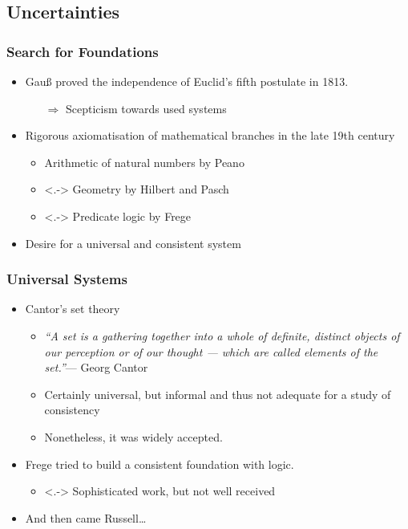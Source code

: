 \documentclass{beamer}
\begin{document}
\subsection{Uncertainties}
\begin{frame}
    \frametitle{Search for Foundations}
    \begin{itemize}[<+->]
	\item Gauß proved the independence of Euclid's fifth postulate in 1813.
	\begin{itemize}
		\item[$\Rightarrow$] Scepticism towards used systems
	\end{itemize}
	\item Rigorous axiomatisation of mathematical branches in the late 19th century
	\begin{itemize}
		\item Arithmetic of natural numbers by Peano
		\item<.-> Geometry by Hilbert and Pasch
		\item<.-> Predicate logic by Frege
	\end{itemize}
	\item Desire for a universal and consistent system
    \end{itemize}
\end{frame}
\begin{frame}
    \frametitle{Universal Systems}
    \begin{itemize}[<+->]
	\item Cantor's set theory
	\begin{itemize}
		\item \textit{``A set is a gathering together into a whole of definite, distinct objects of our perception or of our thought --- which are called elements of the set.''}\nocite{cantor_set}\hfill--- Georg Cantor
		\item Certainly universal, but informal and thus not adequate for a study of consistency
		\item Nonetheless, it was widely accepted.
	\end{itemize}
	\item Frege tried to build a consistent foundation with logic.
	\begin{itemize}
		\item<.-> Sophisticated work, but not well received
	\end{itemize}
	\item And then came Russell\ldots
    \end{itemize}
\end{frame}
\end{document}
